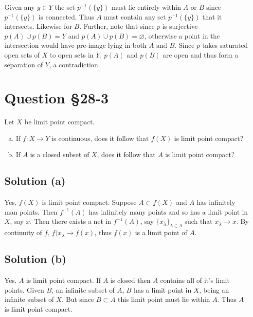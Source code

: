 \documentclass[11pt, oneside]{article}   	%
\newcommand{\tand}{\text{ and }}
\newcommand{\tor}{\text{ or }}
\newcommand{\nullset}{\varnothing}
\newcommand{\set}[1]{\{ #1 \}}
\begin{document}
Given any $y \in Y$ the set $p^{-1}(\set{y})$ must lie entirely within $A \tor B$ since $p^{-1}(\set{y})$ is connected. Thus $A$ must contain any set $p^{-1}(\set{y})$ that it intersects. Likewise for $B$. Further, note that since $p$ is surjective $p(A) \cup p(B) = Y$ and $p(A) \cup p(B) = \nullset$, otherwise a point in the intersection would have pre-image lying in both $A \tand B$. Since $p$ takes saturated open sets of $X$ to open sets in $Y$, $p(A) \tand p(B)$ are open and thus form a separation of $Y$, a contradiction.

\section*{Question \S28-3}
\paragraph{}

Let $X$ be limit point compact.

\begin{enumerate}[(a)]
\item
If $f:X \to Y$ is continuous, does it follow that $f(X)$ is limit point compact?
\item
If $A$ is a closed subset of $X$, does it follow that $A$ is limit point compact?
\end{enumerate}

\subsection*{Solution (a)}
\paragraph{}
 
Yes, $f(X)$ is limit point compact. Suppose $A \subset f(X)$ and $A$ has infinitely man points. Then $f^{-1}(A)$ has infinitely many points and so has a limit point in $X$, say $x$. Then there exists a net in $f^{-1}(A)$, say $\set{x_\lambda}_{\lambda \in \Lambda}$ such that $x_\lambda \to x$. By continuity of $f$, $f(x_\lambda \to f(x)$, thus $f(x)$ is a limit point of $A$.

\subsection*{Solution (b)}
\paragraph{}

Yes, $A$ is limit point compact. If $A$ is closed then $A$ contains all of it's limit points. Given $B$, an infinite subset of $A$, $B$ has a limit point in $X$, being an infinite subset of $X$. But since $B \subset A$ this limit point must lie within $A$. Thus $A$ is limit point compact.


 
 
 
 
 
 
 
 
 
\end{document}
